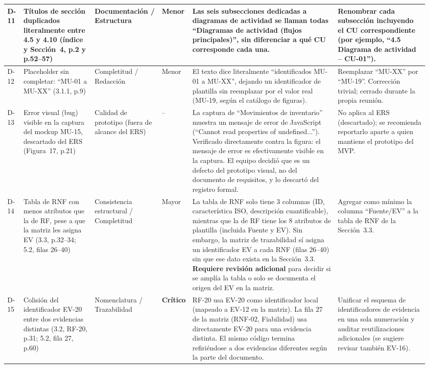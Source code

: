 \documentclass[11pt,a4paper]{article}
\begin{document}
\begin{longtable}{|p{0.6cm}|p{3cm}|p{2.5cm}|p{0.9cm}|p{4.3cm}|p{1.8cm}|}
\hline
D-11 & Títulos de sección duplicados literalmente entre 4.5 y 4.10 (índice y Sección~4, p.2 y p.52--57) & Documentación / Estructura & Menor & Las seis subsecciones dedicadas a diagramas de actividad se llaman todas ``Diagramas de actividad (flujos principales)'', sin diferenciar a qué CU corresponde cada una. & Renombrar cada subsección incluyendo el CU correspondiente (por ejemplo, ``4.5 Diagrama de actividad -- CU-01''). \\
\hline
D-12 & Placeholder sin completar: ``MU-01 a MU-XX'' (3.1.1, p.9) & Completitud / Redacción & Menor & El texto dice literalmente ``identificados MU-01 a MU-XX'', dejando un identificador de plantilla sin reemplazar por el valor real (MU-19, según el catálogo de figuras). & Reemplazar ``MU-XX'' por ``MU-19''. Corrección trivial; cerrado durante la propia reunión. \\
\hline
D-13 & Error visual (bug) visible en la captura del mockup MU-15, descartado del ERS (Figura~17, p.21) & Calidad de prototipo (fuera de alcance del ERS) & -- & La captura de ``Movimientos de inventario'' muestra un mensaje de error de JavaScript (``Cannot read properties of undefined...''). Verificado directamente contra la figura: el mensaje de error es efectivamente visible en la captura. El equipo decidió que es un defecto del prototipo visual, no del documento de requisitos, y lo descartó del registro formal. & No aplica al ERS (descartado); se recomienda reportarlo aparte a quien mantiene el prototipo del MVP. \\
\hline
D-14 & Tabla de RNF con menos atributos que la de RF, pese a que la matriz les asigna EV (3.3, p.32--34; 5.2, filas 26--40) & Consistencia estructural / Completitud & Mayor & La tabla de RNF solo tiene 3 columnas (ID, característica ISO, descripción cuantificable), mientras que la de RF tiene los 8 atributos de plantilla (incluida Fuente y EV). Sin embargo, la matriz de trazabilidad sí asigna un identificador EV a cada RNF (filas 26--40) sin que ese dato exista en la Sección~3.3. \textbf{Requiere revisión adicional} para decidir si se amplía la tabla o solo se documenta el origen del EV en la matriz. & Agregar como mínimo la columna ``Fuente/EV'' a la tabla de RNF de la Sección~3.3. \\
\hline
D-15 & Colisión del identificador EV-20 entre dos evidencias distintas (3.2, RF-20, p.31; 5.2, fila 27, p.60) & Nomenclatura / Trazabilidad & \textbf{Crítico} & RF-20 usa EV-20 como identificador local (mapeado a EV-12 en la matriz). La fila 27 de la matriz (RNF-02, Fiabilidad) usa directamente EV-20 para una evidencia distinta. El mismo código termina refiriéndose a dos evidencias diferentes según la parte del documento. & Unificar el esquema de identificadores de evidencia en una sola numeración y auditar reutilizaciones adicionales (se sugiere revisar también EV-16). \\

\end{longtable}
\end{document}
